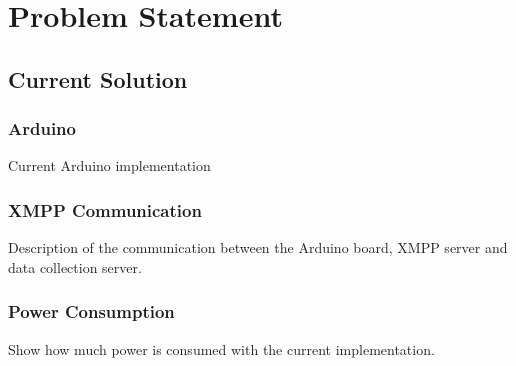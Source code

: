 
\chapter{Problem Statement} %



\ifpdf
    \graphicspath{{X/figures/PNG/}{X/figures/PDF/}{X/figures/}}
\else
    \graphicspath{{X/figures/EPS/}{X/figures/}}
\fi


\section{Current Solution}

\subsection{Arduino}
Current Arduino implementation

\subsection{XMPP Communication}
Description of the communication between the Arduino board, XMPP server and data collection server.

\subsection{Power Consumption}
Show how much power is consumed with the current implementation. 





